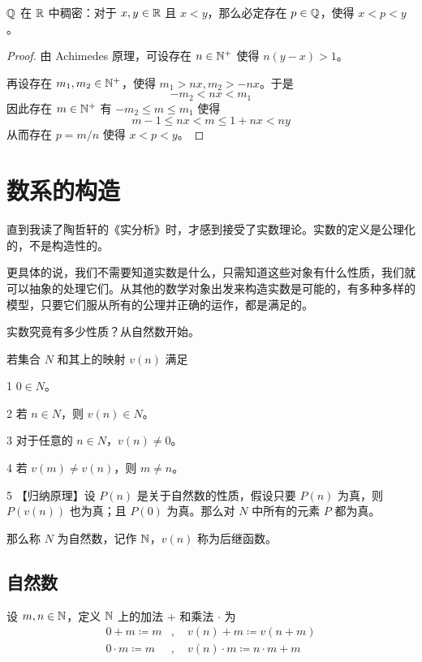 \begin{example}
	$\mathbb{Q}$ 在 $\mathbb{R}$ 中稠密：对于 $x,y \in \mathbb{R}$ 且 $x<y$，那么必定存在 $p\in\mathbb{Q}$，使得 $x<p<y$。
\end{example}
\begin{proof}
	由 Achimedes 原理，可设存在 $n\in \mathbb{N}^+$ 使得 $n(y-x)>1$。
	
	再设存在 $m_1,m_2\in \mathbb{N}^+$，使得 $m_1>nx,m_2>-nx$。于是
	$$-m_2<nx<m_1$$
	因此存在 $m\in \mathbb{N}^+$ 有 $-m_2\leqslant m \leqslant m_1$ 使得
	$$m-1\leqslant nx < m \leqslant 1+nx < ny$$
	从而存在 $p=m/n$ 使得 $x<p<y$。
\end{proof}


\section{数系的构造}

直到我读了陶哲轩的《实分析》时，才感到接受了实数理论。实数的定义是公理化的，不是构造性的。

更具体的说，我们不需要知道实数是什么，只需知道这些对象有什么性质，我们就可以抽象的处理它们。从其他的数学对象出发来构造实数是可能的，有多种多样的模型，只要它们服从所有的公理并正确的运作，都是满足的。

实数究竟有多少性质？从自然数开始。

\begin{axiom}[Peano 公理]
	若集合 $N$ 和其上的映射 $v(n)$ 满足

	\num{1} $0\in N$。

	\num{2} 若 $n\in N$，则 $v(n) \in N$。

	\num{3} 对于任意的 $n\in N$，$v(n) \ne 0$。

	\num{4} 若 $v(m) \ne v(n)$，则 $m\ne n$。

	\num{5} 【归纳原理】设 $P(n)$ 是关于自然数的性质，假设只要 $P(n)$ 为真，则 $P(v(n))$ 也为真；且 $P(0)$ 为真。那么对 $N$ 中所有的元素 $P$ 都为真。

	那么称 $N$ 为自然数，记作 $\mathbb{N}$，$v(n)$ 称为后继函数。
\end{axiom}

\subsection{自然数}

设 $m,n\in \mathbb{N}$，定义 $\mathbb{N}$ 上的加法 $+$ 和乘法 $\cdot$ 为
\begin{equation*}
	\begin{aligned}
		0+m\coloneqq m&,\quad v(n)+m\coloneqq v(n+m)\\
		0\cdot m\coloneqq m&,\quad v(n)\cdot m\coloneqq n \cdot m + m
	\end{aligned}
\end{equation*}

